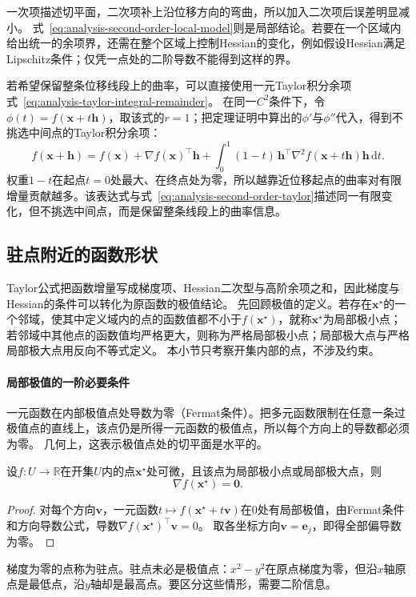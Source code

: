 一次项描述切平面，二次项补上沿位移方向的弯曲，所以加入二次项后误差明显减小。
式~\eqref{eq:analysis-second-order-local-model}则是局部结论。若要在一个区域内给出统一的余项界，还需在整个区域上控制Hessian的变化，例如假设Hessian满足Lipschitz条件；仅凭一点处的二阶导数不能得到这样的界。

若希望保留整条位移线段上的曲率，可以直接使用一元Taylor积分余项式~\eqref{eq:analysis-taylor-integral-remainder}。
在同一$C^2$条件下，令$\phi(t)=f(\bm x+t\bm h)$，取该式的$r=1$；把定理证明中算出的$\phi'$与$\phi''$代入，得到不挑选中间点的Taylor积分余项：
\[
 f(\bm{x}+\bm{h})
 =f(\bm{x})+\nabla f(\bm{x})^{\top}\bm{h}
 +\int_0^1(1-t)\,\bm{h}^{\top}\nabla^2f(\bm{x}+t\bm{h})\bm{h}\,\mathrm{d}t.
\]
权重$1-t$在起点$t=0$处最大、在终点处为零，所以越靠近位移起点的曲率对有限增量贡献越多。该表达式与式~\eqref{eq:analysis-second-order-taylor}描述同一有限变化，但不挑选中间点，而是保留整条线段上的曲率信息。

\subsection{驻点附近的函数形状}

Taylor公式把函数增量写成梯度项、Hessian二次型与高阶余项之和，因此梯度与Hessian的条件可以转化为原函数的极值结论。
先回顾极值的定义。若存在$\bm x^\star$的一个邻域，使其中定义域内的点的函数值都不小于$f(\bm x^\star)$，就称$\bm x^\star$为局部极小点；若邻域中其他点的函数值均严格更大，则称为严格局部极小点；局部极大点与严格局部极大点用反向不等式定义。
本小节只考察开集内部的点，不涉及约束。

\paragraph{局部极值的一阶必要条件}
一元函数在内部极值点处导数为零（Fermat条件）。把多元函数限制在任意一条过极值点的直线上，该点仍是所得一元函数的极值点，所以每个方向上的导数都必须为零。
几何上，这表示极值点处的切平面是水平的。
\begin{theorem}[局部极值的一阶必要条件]
\label{thm:multivariable-extremum-first-order}
设$f:U\to\mathbb R$在开集$U$内的点$\bm x^\star$处可微，且该点为局部极小点或局部极大点，则
\begin{equation}
 \nabla f(\bm x^\star)=\bm0.
\label{eq:analysis-first-order-necessary}
\end{equation}
\end{theorem}
\begin{proof}
对每个方向$\bm v$，一元函数$t\mapsto f(\bm x^\star+t\bm v)$在$0$处有局部极值，由Fermat条件和方向导数公式，导数$\nabla f(\bm x^\star)^\top\bm v=0$。
取各坐标方向$\bm v=\bm e_j$，即得全部偏导数为零。
\end{proof}
梯度为零的点称为驻点。驻点未必是极值点：$x^2-y^2$在原点梯度为零，但沿$x$轴原点是最低点，沿$y$轴却是最高点。要区分这些情形，需要二阶信息。

